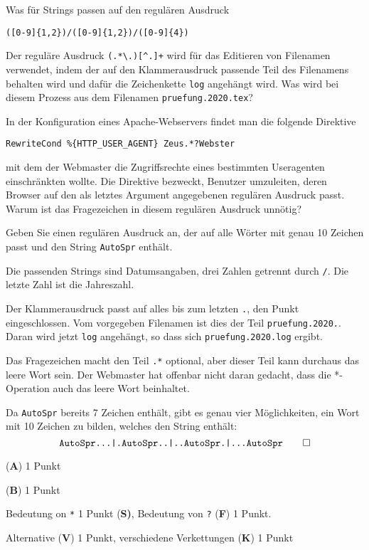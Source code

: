 \begin{teilaufgaben}
\item Was für Strings passen auf den regulären Ausdruck
\begin{verbatim}
([0-9]{1,2})/([0-9]{1,2})/([0-9]{4})
\end{verbatim}
\item
Der reguläre Ausdruck \texttt{(.*\textbackslash.)[\textasciicircum.]+} wird
für das Editieren von Filenamen verwendet, indem der auf den Klammerausdruck
passende Teil des Filenamens behalten wird und dafür die Zeichenkette
\texttt{log} angehängt wird.
Was wird bei diesem Prozess aus dem Filenamen \texttt{pruefung.2020.tex}?
\item
In der Konfiguration eines Apache-Webservers findet man die
folgende Direktive
\begin{verbatim}
RewriteCond %{HTTP_USER_AGENT} Zeus.*?Webster
\end{verbatim}
mit dem der Webmaster die Zugriffsrechte eines bestimmten Useragenten
einschränkten wollte.
Die Direktive bezweckt, Benutzer umzuleiten, deren Browser auf den als
letztes Argument angegebenen regulären Ausdruck passt.
Warum ist das Fragezeichen in diesem regulären Ausdruck unnötig?
\item
Geben Sie einen regulären Ausdruck an, der auf alle Wörter mit genau
10 Zeichen passt und den String \texttt{AutoSpr} enthält.
\end{teilaufgaben}


\begin{loesung}
\begin{teilaufgaben}
\item Die passenden Strings sind Datumsangaben, drei Zahlen getrennt durch
\texttt{/}.
Die letzte Zahl ist die Jahreszahl.
\item Der Klammerausdruck passt auf alles bis zum letzten \texttt{.},
den Punkt eingeschlossen.
Vom vorgegeben Filenamen ist dies der Teil \texttt{pruefung.2020.}.
Daran wird jetzt \texttt{log} angehängt, so dass sich
\texttt{pruefung.2020.log} ergibt.
\item Das Fragezeichen macht den Teil \texttt{.*} optional, aber dieser
Teil kann durchaus das leere Wort sein.
Der Webmaster hat offenbar nicht daran gedacht, dass die *-Operation
auch das leere Wort beinhaltet.
\item Da \texttt{AutoSpr} bereits 7 Zeichen enthält, gibt es genau vier
Möglichkeiten, ein Wort mit 10 Zeichen zu bilden, welches den String
enthält:
\[
\texttt{AutoSpr...|.AutoSpr..|..AutoSpr.|...AutoSpr}
\qedhere
\]
\end{teilaufgaben}
\end{loesung}

\begin{bewertung}
\begin{teilaufgaben}
\item ({\bf A}) 1 Punkt
\item ({\bf B}) 1 Punkt
\item Bedeutung on \texttt{*} 1 Punkt {(\bf S)},
Bedeutung von \texttt{?} ({\bf F}) 1 Punkt.
\item Alternative ({\bf V}) 1 Punkt, verschiedene Verkettungen ({\bf K}) 1 Punkt
\end{teilaufgaben}
\end{bewertung}


